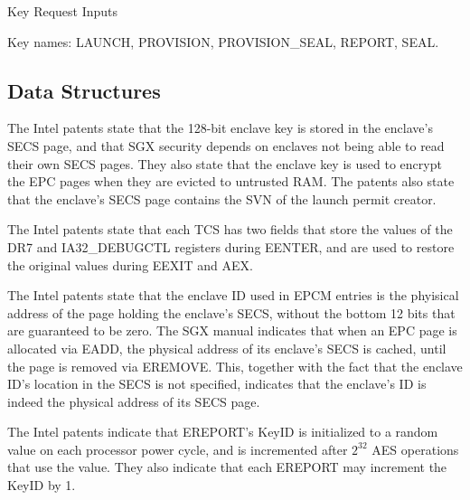 Key Request Inputs

\begin{table}[hbt]
  \caption{Values of the PT (page type) field in an EPCM entry.}
  \label{fig:key_request_inputs}
\end{table}

Key names: LAUNCH, PROVISION, PROVISION\_SEAL, REPORT, SEAL.


\subsection{Data Structures}

The Intel patents state that the 128-bit enclave key is stored in the enclave's
SECS page, and that SGX security depends on enclaves not being able to read
their own SECS pages. They also state that the enclave key is used to encrypt
the EPC pages when they are evicted to untrusted RAM. The patents also state
that the enclave's SECS page contains the SVN of the launch permit creator.

The Intel patents state that each TCS has two fields that store the values of
the DR7 and IA32\_DEBUGCTL registers during EENTER, and are used to restore the
original values during EEXIT and AEX.

The Intel patents state that the enclave ID used in EPCM entries is the
phyisical address of the page holding the enclave's SECS, without the bottom
12 bits that are guaranteed to be zero. The SGX manual indicates that when an
EPC page is allocated via EADD, the physical address of its enclave's SECS is
cached, until the page is removed via EREMOVE. This, together with the fact
that the enclave ID's location in the SECS is not specified, indicates that the
enclave's ID is indeed the physical address of its SECS page.


The Intel patents indicate that EREPORT's KeyID is initialized to a random
value on each processor power cycle, and is incremented after $2^{32}$ AES
operations that use the value. They also indicate that each EREPORT may
increment the KeyID by 1.


